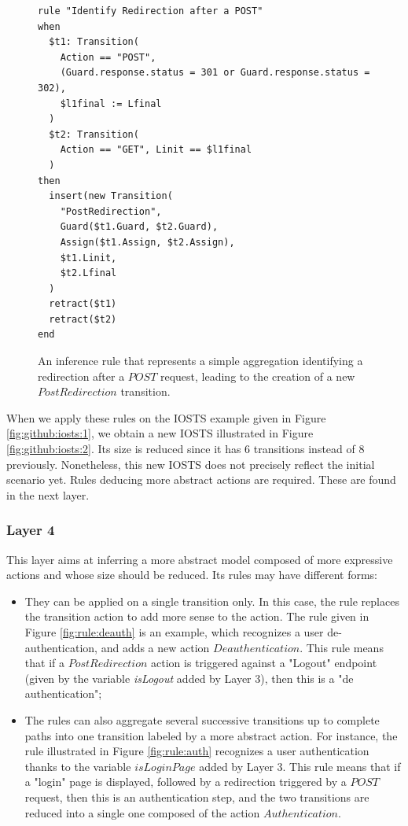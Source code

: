 \begin{figure}[h]
\begin{framed}
\begin{BVerbatim}
rule "Identify Redirection after a POST"
when
  $t1: Transition(
    Action == "POST",
    (Guard.response.status = 301 or Guard.response.status = 302),
    $l1final := Lfinal
  )
  $t2: Transition(
    Action == "GET", Linit == $l1final
  )
then
  insert(new Transition(
    "PostRedirection",
    Guard($t1.Guard, $t2.Guard),
    Assign($t1.Assign, $t2.Assign),
    $t1.Linit,
    $t2.Lfinal
  )
  retract($t1)
  retract($t2)
end
\end{BVerbatim}
\end{framed}

\caption{An inference rule that represents a simple aggregation
identifying a redirection after a $POST$ request, leading to the
creation of a new $PostRedirection$ transition.}
\label{fig:rule:redirect}
\end{figure}

\begin{example}
When we apply these rules on the IOSTS example given in Figure
\ref{fig:github:iosts:1}, we obtain a new IOSTS illustrated in
Figure \ref{fig:github:iosts:2}. Its size is reduced since it has
6 transitions instead of 8 previously. Nonetheless, this new
IOSTS does not precisely reflect the initial scenario yet. Rules
deducing more abstract actions are required. These are found in
the next layer.
\end{example}

\subsubsection{Layer 4}

This layer aims at inferring a more abstract model composed of
more expressive actions and whose size should be reduced. Its
rules may have different forms:

\begin{itemize}
\item They can be applied on a single transition only. In this
case, the rule replaces the transition action to add more sense
to the action. The rule given in Figure \ref{fig:rule:deauth} is
an example, which recognizes a user de-authentication, and adds a
new action $Deauthentication$. This rule means that if a
$PostRedirection$ action is triggered against a "Logout" endpoint
(given by the variable \textit{isLogout} added by Layer 3), then
this is a "de authentication";

\item The rules can also aggregate several successive transitions
up to complete paths into one transition labeled by a more
abstract action. For instance, the rule illustrated in Figure
\ref{fig:rule:auth} recognizes a user authentication thanks to
the variable $isLoginPage$ added by Layer 3. This rule means that
if a "login" page is displayed, followed by a redirection
triggered by a $POST$ request, then this is an authentication
step, and the two transitions are reduced into a single one
composed of the action $Authentication$.
\end{itemize}

